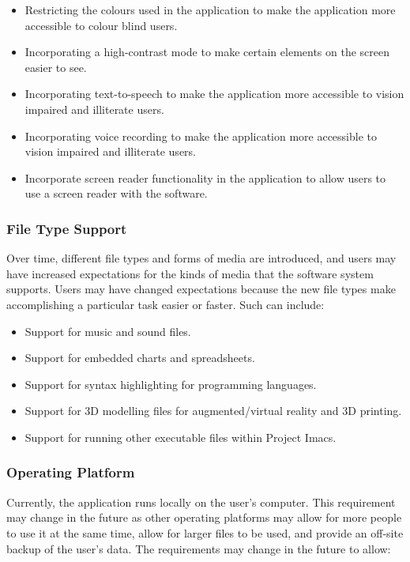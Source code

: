 \documentclass{article}
\begin{document}
\begin{itemize}
\item Restricting the colours used in the application to make the application more accessible to colour blind users.
\item Incorporating a high-contrast mode to make certain elements on the screen easier to see.
\item Incorporating text-to-speech to make the application more accessible to vision impaired and illiterate users.
\item Incorporating voice recording to make the application more accessible to vision impaired and illiterate users.
\item Incorporate screen reader functionality in the application to allow users to use a screen reader with the software.
\end{itemize}

\subsubsection{File Type Support}
Over time, different file types and forms of media are introduced, and users may have increased expectations for the kinds of media that the software system supports. Users may have changed expectations because the new file types make accomplishing a particular task easier or faster. Such can include:

\begin{itemize}
\item Support for music and sound files.
\item Support for embedded charts and spreadsheets.
\item Support for syntax highlighting for programming languages.
\item Support for 3D modelling files for augmented/virtual reality and 3D printing.
\item Support for running other executable files within Project Imacs.
\end{itemize}

\newpage
\subsubsection{Operating Platform}
Currently, the application runs locally on the user's computer. This requirement may change in the future as other operating platforms may allow for more people to use it at the same time, allow for larger files to be used, and provide an off-site backup of the user's data. The requirements may change in the future to allow:
\end{document}

